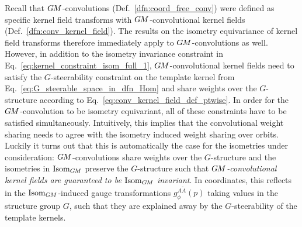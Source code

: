 Recall that $G\mkern-1.4muM$-convolutions (Def.~\ref{dfn:coord_free_conv}) were defined as specific kernel field transforms with $G\mkern-1.4muM$-convolutional kernel fields (Def.~\ref{dfn:conv_kernel_field}).
The results on the isometry equivariance of kernel field transforms therefore immediately apply to $G\mkern-1.4muM$-convolutions as well.
However, in addition to the isometry invariance constraint in Eq.~\eqref{eq:kernel_constraint_isom_full_1}, $G\mkern-1.4muM$-convolutional kernel fields need to satisfy the $G$-steerability constraint on the template kernel from Eq.~\eqref{eq:G_steerable_space_in_dfn_Hom} and share weights over the $G$-structure according to Eq.~\eqref{eq:conv_kernel_field_def_ptwise}.
In order for the $G\mkern-1.4muM$-convolution to be isometry equivariant, all of these constraints have to be satisfied simultaneously.
Intuitively, this implies that the convolutional weight sharing needs to agree with the isometry induced weight sharing over orbits.
Luckily it turns out that this is automatically the case for the isometries under consideration:
$G\mkern-1.4muM$-convolutions share weights over the $G$-structure and the isometries in $\operatorname{Isom}_{G\mkern-1.4muM}$ preserve the $G$-structure such that \emph{$G\mkern-1.4muM$-convolutional kernel fields are guaranteed to be $\operatorname{Isom}_{G\mkern-1.4muM}$ invariant}.
In coordinates, this reflects in the $\operatorname{Isom}_{G\mkern-1.4muM}$-induced gauge transformations $g_\phi^{A\widetilde{A}}(p)$ taking values in the structure group $G$, such that they are explained away by the $G$-steerability of the template kernels.


